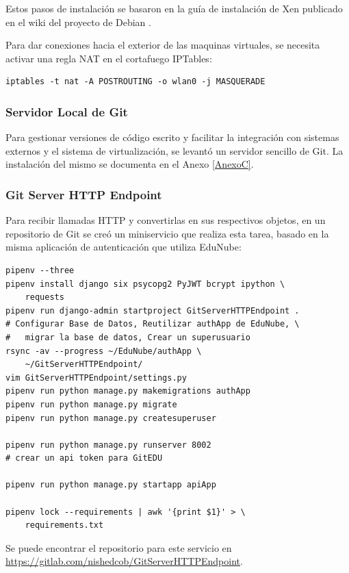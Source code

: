 Estos pasos de instalación se basaron en la guía de instalación de Xen publicado en el wiki del proyecto de Debian \citep{Debian-Wiki-Xen}.

Para dar conexiones hacia el exterior de las maquinas virtuales, se necesita activar una regla NAT en el cortafuego IPTables:

\begin{lstlisting}[breaklines=true]
	iptables -t nat -A POSTROUTING -o wlan0 -j MASQUERADE
\end{lstlisting}

 
\subsubsection{Servidor Local de Git}
Para gestionar versiones de código escrito y facilitar la integración con sistemas externos y el sistema de virtualización, se levantó un servidor sencillo de Git. La instalación del mismo se documenta en el Anexo \ref{AnexoC}.

 
\subsubsection{Git Server HTTP Endpoint}
Para recibir llamadas HTTP y convertirlas en sus respectivos objetos, en un repositorio de Git se creó un miniservicio que realiza esta tarea, basado en la misma aplicación de autenticación que utiliza EduNube:
\begin{lstlisting}
pipenv --three
pipenv install django six psycopg2 PyJWT bcrypt ipython \
	requests
pipenv run django-admin startproject GitServerHTTPEndpoint .
# Configurar Base de Datos, Reutilizar authApp de EduNube, \
#	migrar la base de datos, Crear un superusuario
rsync -av --progress ~/EduNube/authApp \
	~/GitServerHTTPEndpoint/
vim GitServerHTTPEndpoint/settings.py
pipenv run python manage.py makemigrations authApp
pipenv run python manage.py migrate
pipenv run python manage.py createsuperuser

pipenv run python manage.py runserver 8002
# crear un api token para GitEDU

pipenv run python manage.py startapp apiApp

pipenv lock --requirements | awk '{print $1}' > \
	requirements.txt
\end{lstlisting}

Se puede encontrar el repositorio para este servicio en \url{https://gitlab.com/nishedcob/GitServerHTTPEndpoint}.

